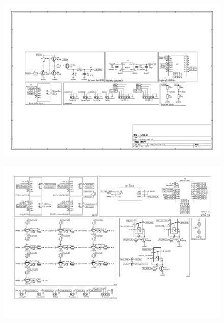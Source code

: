     \begin{landscape}
        \begin{figure}
            \centering
            \includegraphics[angle=270, width=\textwidth,height=\textheight,keepaspectratio]{Imagenes/Anexo_A/Esquemático - MPPT.pdf}
            \label{fig:A_1}
        \end{figure}
        
        \newpage

        \begin{figure}
            \centering
            \includegraphics[angle=270, width=\textwidth,height=\textheight,keepaspectratio]{Imagenes/Anexo_A/Esquemático - Etapa_de_Control.pdf}
            \label{fig:A_2}
        \end{figure}


\end{landscape}
